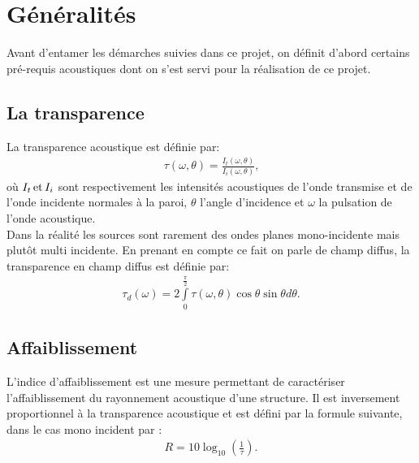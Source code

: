 \documentclass[12pt,foolscap]{report}
\begin{document}
	\section{Généralités}
	Avant d'entamer les démarches suivies dans ce projet, on définit 
	d'abord certains pré-requis acoustiques dont on s'est servi pour la 
	réalisation de ce projet.\\ 
	\subsection*{La transparence} 
	La transparence acoustique est définie par: \\
	\begin{align}
	\tau (\omega ,\theta ) = \frac{{{I_t}(\omega ,\theta )}}{{{I_i}(\omega ,\theta )}}\text{,}
	\label{eq:transtau}
	\end{align}
	où \({I_t}\,{\rm{et}}\,{I_i}\) sont respectivement les intensités acoustiques de l'onde transmise et de l'onde incidente normales à la paroi, \(\theta \) l'angle d'incidence et \(\omega \) la pulsation de l'onde acoustique. \\
	
	Dans la réalité les sources sont rarement des ondes planes mono-incidente mais plutôt multi incidente. En prenant en compte ce fait on parle de champ diffus, la transparence en champ diffus est définie par: \\
	\begin{align}
	{\tau _d}(\omega ) = 2\int\limits_0^{\frac{\pi }{2}} {\tau (\omega ,\theta )\cos \theta \sin \theta d\theta } \text{.}
	\end{align}
	
	\subsection*{Affaiblissement} 
	L'indice d'affaiblissement est une mesure permettant de caractériser 
	l'affaiblissement du rayonnement acoustique d'une structure. Il est inversement proportionnel à la transparence acoustique et est 
	défini par la formule suivante, dans le cas mono incident par : \\
	\begin{align}
	R = 10{\log _{10}}\left( {\frac{1}{\tau }} \right)\text{.}
	\label{eq:affaibl}
	\end{align}
\end{document}
